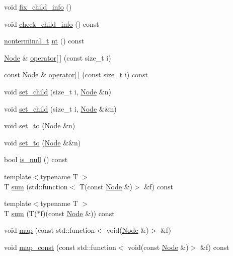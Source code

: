 \begin{DoxyCompactItemize}
\item 
void \hyperlink{class_node_a8f25f44608c0b19fe02eaf19ade9ea68}{fix\+\_\+child\+\_\+info} ()
\item 
void \hyperlink{class_node_ab8f9492893b0e2b2d7b3d1819dacc92b}{check\+\_\+child\+\_\+info} () const
\item 
\hyperlink{_nonterminal_8h_a5c1f658dc7560600a16d22408bd716ca}{nonterminal\+\_\+t} \hyperlink{class_node_a4abe3acdc804489a01ef13a25b130fd8}{nt} () const
\item 
\hyperlink{class_node}{Node} \& \hyperlink{class_node_a0b89084e2c7416379edb7c537edcc8f2}{operator\mbox{[}$\,$\mbox{]}} (const size\+\_\+t i)
\item 
const \hyperlink{class_node}{Node} \& \hyperlink{class_node_a8bdfdaa5eb291ae5fb417f45fb8a3633}{operator\mbox{[}$\,$\mbox{]}} (const size\+\_\+t i) const
\item 
void \hyperlink{class_node_afff50c3712b8e30fffd479cad4eee023}{set\+\_\+child} (size\+\_\+t i, \hyperlink{class_node}{Node} \&n)
\item 
void \hyperlink{class_node_a486882370d2c9592c6eabb52a3289253}{set\+\_\+child} (size\+\_\+t i, \hyperlink{class_node}{Node} \&\&n)
\item 
void \hyperlink{class_node_a1a6f6c8062e66046c302a80cc7e8d817}{set\+\_\+to} (\hyperlink{class_node}{Node} \&n)
\item 
void \hyperlink{class_node_a10c63ea2ec819dc5b195c4df33cde113}{set\+\_\+to} (\hyperlink{class_node}{Node} \&\&n)
\item 
bool \hyperlink{class_node_a895ef3b66f975fbaec1e5866a57afbed}{is\+\_\+null} () const
\item 
{\footnotesize template$<$typename T $>$ }\\T \hyperlink{class_node_ac91282056a0df2835f1579bdd21c93e1}{sum} (std\+::function$<$ T(const \hyperlink{class_node}{Node} \&)$>$ \&f) const
\item 
{\footnotesize template$<$typename T $>$ }\\T \hyperlink{class_node_a089e99addd93f91b2ef5a9d0c3e6bdeb}{sum} (T($\ast$f)(const \hyperlink{class_node}{Node} \&)) const
\item 
void \hyperlink{class_node_adefac3cb7b411321c5af15dad1484834}{map} (const std\+::function$<$ void(\hyperlink{class_node}{Node} \&)$>$ \&f)
\item 
void \hyperlink{class_node_a4337bb93da78e142c6171fd81acab93c}{map\+\_\+const} (const std\+::function$<$ void(const \hyperlink{class_node}{Node} \&)$>$ \&f) const
\item 

\end{DoxyCompactItemize}
